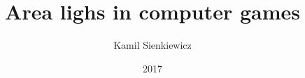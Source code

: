 \documentclass[pl]{minipw/minipw}
\title{Area lighs in computer games}
\author{Kamil Sienkiewicz}
\date{2017}
\begin{document}
\sloppy
\setcounter{page}{1}




\cleardoublepage
\tableofcontents

\listoftodos

\cleardoublepage
\pagestyle{fancy}







\begin{appendices}

\end{appendices}



\end{document}
